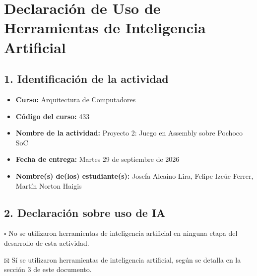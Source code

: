 \section*{Declaración de Uso de Herramientas de Inteligencia Artificial}


\subsection*{1. Identificación de la actividad}
\begin{itemize}
    \item \textbf{Curso:} Arquitectura de Computadores
    \item \textbf{Código del curso:} 433
    \item \textbf{Nombre de la actividad:} Proyecto 2: Juego en Assembly sobre Pochoco SoC
    \item \textbf{Fecha de entrega:} Martes 29 de septiembre de 2026
    \item \textbf{Nombre(s) de(los) estudiante(s):} Josefa Alcaíno Lira, Felipe Izcúe Ferrer, Martín Norton Haigis
\end{itemize}

\subsection*{2. Declaración sobre uso de IA}
\noindent $\square$ No se utilizaron herramientas de inteligencia artificial en ninguna etapa del desarrollo de esta actividad.

\noindent $\boxtimes$ Sí se utilizaron herramientas de inteligencia artificial, según se detalla en la sección 3 de este documento.

